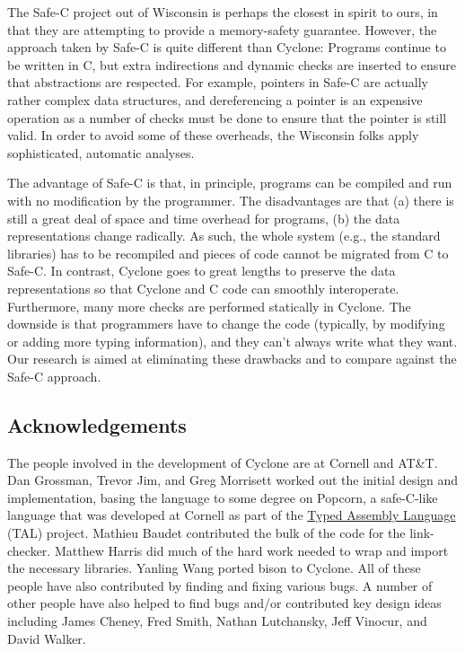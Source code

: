 The Safe-C project out of Wisconsin is perhaps the closest in spirit
to ours, in that they are attempting to provide a memory-safety
guarantee. However, the approach taken by Safe-C is quite different
than Cyclone: Programs continue to be written in C, but extra
indirections and dynamic checks are inserted to ensure that
abstractions are respected. For example, pointers in Safe-C are
actually rather complex data structures, and dereferencing a pointer
is an expensive operation as a number of checks must be done to ensure
that the pointer is still valid. In order to avoid some of these
overheads, the Wisconsin folks apply sophisticated, automatic
analyses.

The advantage of Safe-C is that, in principle, programs can be compiled
and run with no modification by the programmer. The disadvantages are
that (a) there is still a great deal of space and time overhead for
programs, (b) the data representations change radically. As such, the
whole system (e.g., the standard libraries) has to be recompiled and
pieces of code cannot be migrated from C to Safe-C\@. In contrast,
Cyclone goes to great lengths to preserve the data representations so
that Cyclone and C code can smoothly interoperate. Furthermore, many
more checks are performed statically in Cyclone. The downside is that
programmers have to change the code (typically, by modifying or adding
more typing information), and they can't always write what they want.
Our research is aimed at eliminating these drawbacks and to compare
against the Safe-C approach.

\subsection{Acknowledgements}

The people involved in the development of Cyclone are at Cornell and
AT\&T\@.  Dan Grossman, Trevor Jim, and Greg Morrisett worked out the
initial design and implementation, basing the language to some degree
on Popcorn, a safe-C-like language that was developed at Cornell as
part of the
\href{http://www.cs.cornell.edu/talc}{Typed Assembly Language} (TAL)
project.  Mathieu Baudet contributed the bulk of the code for the
link-checker.  Matthew Harris did much of the hard work needed to
wrap and import the necessary libraries.  Yanling Wang ported bison
to Cyclone.  All of these people have also contributed by finding
and fixing various bugs.  A number of other people have also helped
to find bugs and/or contributed key design ideas including James Cheney, 
Fred Smith, Nathan Lutchansky, Jeff Vinocur, and David Walker.  

